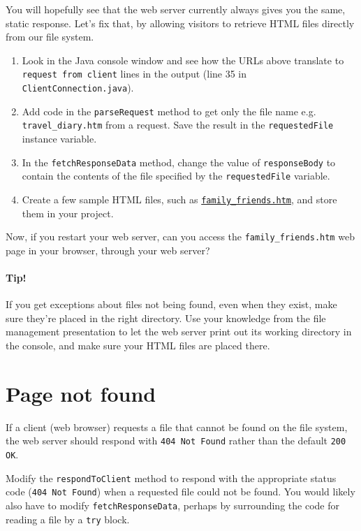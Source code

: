 \documentclass[a4paper, english]{article}
\begin{document}
        You will hopefully see that the web server currently always gives you the same, static response. Let's fix that, by allowing visitors to retrieve HTML files directly from our file system.

        \begin{enumerate}
            \item Look in the Java console window and see how the URLs above translate to \texttt{request from client} lines in the output (line 35 in \texttt{ClientConnection.java}).
            \item Add code in the \texttt{parseRequest} method to get only the file name {e.g. \texttt{travel\_diary.htm}} from a request. Save the result in the \texttt{requestedFile} instance variable.
            \item In the \texttt{fetchResponseData} method, change the value of \texttt{responseBody} to contain the contents of the file specified by the \texttt{requestedFile} variable.
            \item Create a few sample HTML files, such as \href{https://klistra.in/51oU0Njg}{\texttt{family\_friends.htm}}, and store them in your project.
        \end{enumerate}

        Now, if you restart your web server, can you access the \texttt{family\_friends.htm} web page in your browser, through your web server?

        \paragraph{Tip!} If you get exceptions about files not being found, even when they exist, make sure they're placed in the right directory. Use your knowledge from the file management presentation to let the web server print out its working directory in the console, and make sure your HTML files are placed there.
    
    \section{Page not found}
        If a client (web browser) requests a file that cannot be found on the file system, the web server should respond with \texttt{404 Not Found} rather than the default \texttt{200 OK}.
        
        Modify the \texttt{respondToClient} method to respond with the appropriate status code (\texttt{404 Not Found}) when a requested file could not be found. You would likely also have to modify \texttt{fetchResponseData}, perhaps by surrounding the code for reading a file by a \texttt{try} block.
\end{document}

